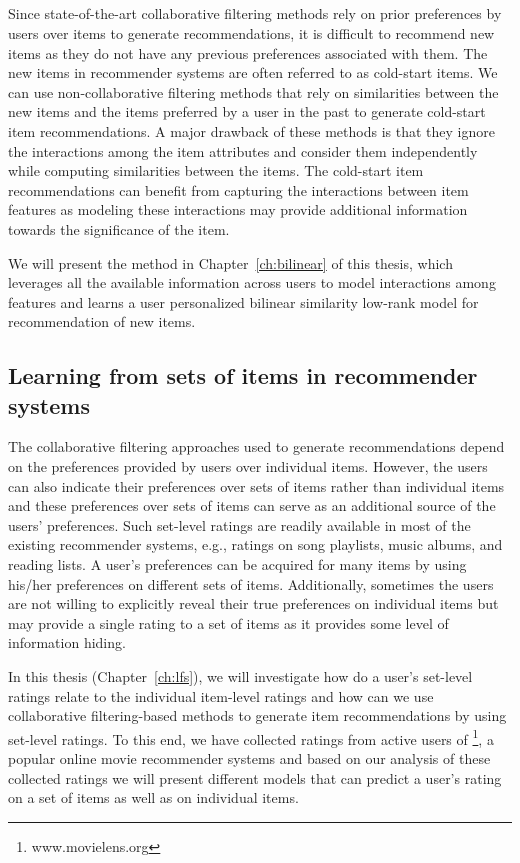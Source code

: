 \subsection{\CFEXPB}
Since state-of-the-art collaborative filtering methods rely on prior preferences by users over items to generate recommendations, it is difficult to recommend new items as they do not have any previous preferences associated with them. The new items in recommender systems are often referred to as cold-start items. We can use non-collaborative filtering methods that rely on similarities between the new items and the items preferred by a user in the past to generate cold-start item recommendations. A major drawback of these methods is that they ignore the interactions among the item attributes and consider them independently while computing similarities between the items. The cold-start item recommendations can benefit from capturing the interactions between item features as modeling these interactions may provide additional information towards the significance of the item. 

We will present the method \CFEXPB in Chapter~\ref{ch:bilinear} of this thesis, which leverages all the available information across users to model interactions among features and learns a user personalized bilinear similarity low-rank model for \TOPN recommendation of new items.


\subsection{Learning from sets of items in recommender systems}

The collaborative filtering approaches used to generate recommendations depend
on the preferences provided by users over individual items. However, the users
can also indicate their preferences over sets of items rather than individual
items and these preferences over sets of items can serve as an additional source
of the users' preferences.  Such set-level ratings are readily available in most
of the existing recommender systems, e.g., ratings on song playlists, music albums,
and reading lists. A user's preferences can be acquired for many items by using
his/her preferences on different sets of items. Additionally, sometimes the users
are not willing to explicitly reveal their true preferences on individual items
but may provide a single rating to a set of items as it provides some level of
information hiding. 


In this thesis (Chapter~\ref{ch:lfs}), we will investigate how do a user's set-level ratings relate to the individual item-level ratings and how can we use collaborative filtering-based methods to generate item recommendations by using set-level ratings. To this end, we have collected ratings from active users of \ML\footnote{www.movielens.org}, a popular online movie recommender systems and based on our analysis of these collected ratings we will present different models that can predict a user's rating on a set of items as well as on individual items.

